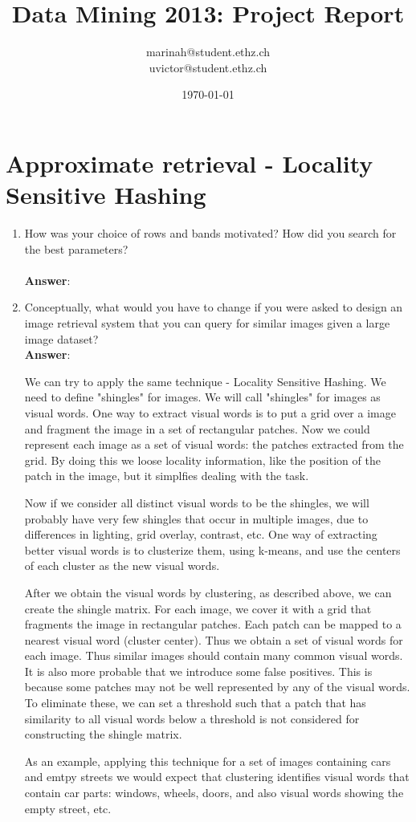 \documentclass[11pt]{article}
\title{Data Mining 2013: Project Report}
\author{marinah@student.ethz.ch\\ uvictor@student.ethz.ch\\}
\date{\today}
\begin{document}
\maketitle

\section{Approximate retrieval - Locality Sensitive Hashing}
\begin{enumerate}
\item How was your choice of rows and bands motivated? How did you search for the
best parameters? \\ \\
\textbf{Answer}:

\item Conceptually, what would you have to change if you were asked to design an image
  retrieval system that you can query for similar images given a large image
  dataset? \\

\textbf{Answer}:

We can try to apply the same technique - Locality Sensitive Hashing. We need to
define "shingles" for images. We will call "shingles" for images as visual words. One way to extract visual words is to put a grid over a image and fragment the image in a set of rectangular patches. Now we could represent each image as a set of visual words: the patches extracted from the grid. By doing this we loose
locality information, like the position of the patch in the image, but it 
simplfies dealing with the task.

Now if we consider all distinct visual words to be the shingles, we will probably have very few shingles that occur in multiple images, due to differences in lighting, grid overlay, contrast, etc. One way of extracting better visual words is to clusterize them, using k-means, and use the centers of each cluster as the new visual words. 

After we obtain the visual words by clustering, as described above, we can create the shingle matrix. For each image, we cover it with a grid that fragments the image in rectangular patches. Each patch can be mapped to a nearest visual word
(cluster center). Thus we obtain a set of visual words for each image. Thus similar images should contain many common visual words. It is also more probable that we introduce some false positives. This is because some patches may not be well represented by any of the visual words. To eliminate these, we can set a threshold such that a patch that has similarity to all visual words below a threshold is not considered for constructing the shingle matrix.

As an example, applying this technique for a set of images containing cars and emtpy streets we would expect that clustering identifies visual words that contain car parts: windows, wheels, doors, and also visual words showing the empty street, etc.

\end{enumerate}
\end{document}
